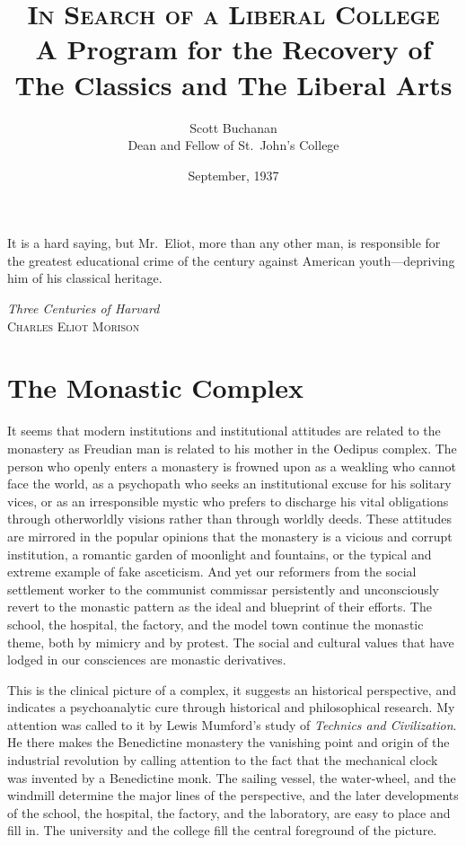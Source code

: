 \documentclass{memoir}
\title{\textsc{In Search of a Liberal College}\\ A Program for the Recovery of The Classics and The Liberal Arts}
\author{Scott Buchanan\\ Dean and Fellow of St.\ John's College}
\date{September, 1937}
\begin{document}
\maketitle

\epigraph{It is a hard saying, but Mr.\ Eliot, more than any
other man, is responsible for the greatest educational crime
of the century against American youth---depriving him of his
classical heritage.}{\emph{Three Centuries of Harvard}\\
\textsc{Charles Eliot Morison}}

\tableofcontents*

\chapter{The Monastic Complex}

It seems that modern institutions and institutional attitudes are
related to the monastery as Freudian man is related to his mother
in the Oedipus complex. The person who openly enters a monastery is
frowned upon as a weakling who cannot face the world, as a psychopath
who seeks an institutional excuse for his solitary vices, or as an
irresponsible mystic who prefers to discharge his vital obligations
through otherworldly visions rather than through worldly deeds. These
attitudes are mirrored in the popular opinions that the monastery is
a vicious and corrupt institution, a romantic garden of moonlight and
fountains, or the typical and extreme example of fake asceticism. And
yet our reformers from the social settlement worker to the communist
commissar persistently and unconsciously revert to the monastic pattern
as the ideal and blueprint of their efforts. The school, the hospital,
the factory, and the model town continue the monastic theme, both by
mimicry and by protest. The social and cultural values that have lodged
in our consciences are monastic derivatives.

This is the clinical picture of a complex, it suggests an historical
perspective, and indicates a psychoanalytic cure through historical
and philosophical research. My attention was called to it by Lewis
Mumford's study of \emph{Technics and Civilization}. He there makes the
Benedictine monastery the vanishing point and origin of the industrial
revolution by calling attention to the fact that the mechanical clock
was invented by a Benedictine monk. The sailing vessel, the water-wheel,
and the windmill determine the major lines of the perspective, and
the later developments of the school, the hospital, the factory, and
the laboratory, are easy to place and fill in. The university and the
college fill the central foreground of the picture.
\end{document}
